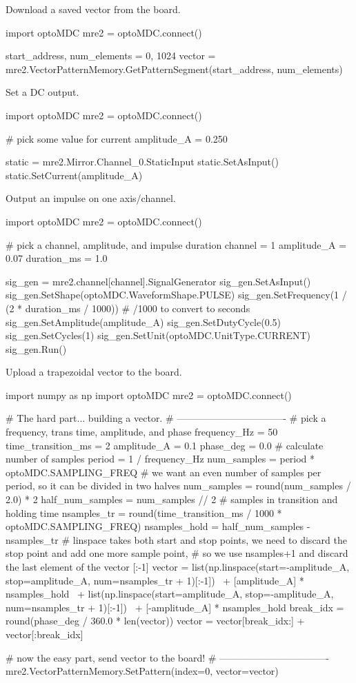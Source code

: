 Download a saved vector from the board. \begin{DoxyVerb}import optoMDC
mre2 = optoMDC.connect()

start_address, num_elements = 0, 1024
vector = mre2.VectorPatternMemory.GetPatternSegment(start_address, num_elements)
\end{DoxyVerb}
 Set a DC output. \begin{DoxyVerb}import optoMDC
mre2 = optoMDC.connect()

# pick some value for current
amplitude_A = 0.250

static = mre2.Mirror.Channel_0.StaticInput
static.SetAsInput()
static.SetCurrent(amplitude_A)
\end{DoxyVerb}
 Output an impulse on one axis/channel. \begin{DoxyVerb}import optoMDC
mre2 = optoMDC.connect()

# pick a channel, amplitude, and impulse duration
channel = 1
amplitude_A = 0.07
duration_ms = 1.0

sig_gen = mre2.channel[channel].SignalGenerator
sig_gen.SetAsInput()
sig_gen.SetShape(optoMDC.WaveformShape.PULSE)
sig_gen.SetFrequency(1 / (2 * duration_ms / 1000))  # /1000 to convert to seconds
sig_gen.SetAmplitude(amplitude_A)
sig_gen.SetDutyCycle(0.5)
sig_gen.SetCycles(1)
sig_gen.SetUnit(optoMDC.UnitType.CURRENT)
sig_gen.Run()
\end{DoxyVerb}
 Upload a trapezoidal vector to the board. \begin{DoxyVerb}import numpy as np
import optoMDC
mre2 = optoMDC.connect()

# The hard part... building a vector.
# ----------------------------------
# pick a frequency, trans time, amplitude, and phase
frequency_Hz = 50
time_transition_ms = 2
amplitude_A = 0.1
phase_deg = 0.0
# calculate number of samples
period = 1 / frequency_Hz
num_samples = period * optoMDC.SAMPLING_FREQ
# we want an even number of samples per period, so it can be divided in two halves
num_samples = round(num_samples / 2.0) * 2
half_num_samples = num_samples // 2
# samples in transition and holding time
nsamples_tr = round(time_transition_ms / 1000 * optoMDC.SAMPLING_FREQ)
nsamples_hold = half_num_samples - nsamples_tr
# linspace takes both start and stop points, we need to discard the stop point and add one more sample point,
# so we use nsamples+1 and discard the last element of the vector [:-1]
vector = list(np.linspace(start=-amplitude_A, stop=amplitude_A, num=nsamples_tr + 1)[:-1]) \
         + [amplitude_A] * nsamples_hold \
         + list(np.linspace(start=amplitude_A, stop=-amplitude_A, num=nsamples_tr + 1)[:-1]) \
         + [-amplitude_A] * nsamples_hold
break_idx = round(phase_deg / 360.0 * len(vector))
vector = vector[break_idx:] + vector[:break_idx]

# now the easy part, send vector to the board!
# ----------------------------------
mre2.VectorPatternMemory.SetPattern(index=0, vector=vector)
\end{DoxyVerb}
